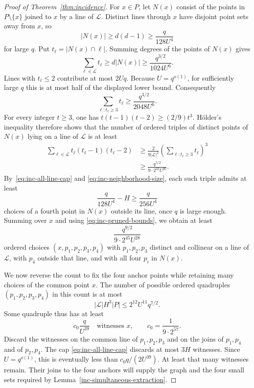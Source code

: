 \begin{proof}[Proof of Theorem~\ref{thm:incidence}]
For $x\in P$, let $N(x)$ consist of the points in $P\setminus\{x\}$
joined to $x$ by a line of $\mathcal L$. Distinct lines through $x$
have disjoint point sets away from $x$, so
\begin{equation}\label{eq:inc-neighborhood-size}
 |N(x)|\ge d(d-1)\ge\frac{q}{128U^4}
\end{equation}
for large $q$. Put $t_\ell=|N(x)\cap\ell|$. Summing degrees of the
points of $N(x)$ gives
\[
 \sum_{\ell\in\mathcal L}t_\ell
 \ge d|N(x)|\ge\frac{q^{3/2}}{1024U^6}.
\]
Lines with $t_\ell\le2$ contribute at most $2Uq$. Because $U=q^{o(1)}$,
for sufficiently large $q$ this is at most half of the displayed
lower bound. Consequently
\[
 \sum_{\ell:t_\ell\ge3}t_\ell
 \ge\frac{q^{3/2}}{2048U^6}.
\]
For every integer $t\ge3$, one has
$t(t-1)(t-2)\ge(2/9)t^3$. H\"older's inequality therefore shows
that the number of ordered triples of distinct points of $N(x)$
lying on a line of $\mathcal L$ is at least
\begin{equation}\label{eq:inc-collinear-triples}
 \begin{split}
 \sum_{\ell\in\mathcal L}t_\ell(t_\ell-1)(t_\ell-2)
 &\ge\frac{2}{9|\mathcal L|^2}
       \left(\sum_{\ell:t_\ell\ge3}t_\ell\right)^3\\
 &\ge\frac{q^{5/2}}{9\cdot2^{32}U^{20}}.
 \end{split}
\end{equation}
By~\eqref{eq:inc-all-line-cap} and
\eqref{eq:inc-neighborhood-size}, each such triple admits at least
\[
 \frac{q}{128U^4}-H\ge\frac{q}{256U^4}
\]
choices of a fourth point in $N(x)$ outside its line, once $q$ is
large enough. Summing over $x$ and using
\eqref{eq:inc-pruned-bounds}, we obtain at least
\begin{equation}\label{eq:inc-witness-quadruple-count}
 \frac{q^{9/2}}{9\cdot2^{45}U^{28}}
\end{equation}
ordered choices $(x,p_1,p_2,p_3,p_4)$ with $p_1,p_2,p_3$ distinct
and collinear on a line of $\mathcal L$, with $p_4$ outside that
line, and with all four $p_i$ in $N(x)$.

We now reverse the count to fix the four anchor points while retaining
many choices of the common point $x$. The number of possible ordered
quadruples $(p_1,p_2,p_3,p_4)$ in this count is at most
\begin{equation}\label{eq:inc-quadruple-upper-bound}
 |\mathcal L|H^3|P|
 \le2^{12}U^{11}q^{7/2}.
\end{equation}
Some quadruple thus has at least
\begin{equation}\label{eq:inc-common-witnesses}
 c_0\frac{q}{U^{39}}
 \quad\text{witnesses }x,\qquad
 c_0=\frac1{9\cdot2^{57}}.
\end{equation}
Discard the witnesses on the common line of $p_1,p_2,p_3$ and on
the joins of $p_1,p_4$ and of $p_2,p_4$. The cap
\eqref{eq:inc-all-line-cap} discards at most $3H$ witnesses.
Since $U=q^{o(1)}$, this is eventually less than
$c_0q/(2U^{39})$. At least that many witnesses remain. Their joins
to the four anchors will supply the graph and the four small sets
required by Lemma~\ref{inc-simultaneous-extraction}.


\end{proof}
